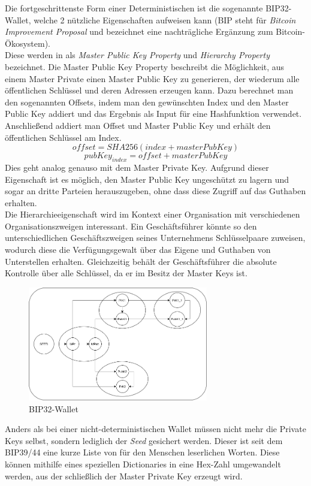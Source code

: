 Die fortgeschrittenste Form einer Deterministischen ist die sogenannte BIP32-Wallet, welche 2 nützliche Eigenschaften aufweisen kann (BIP steht für \emph{Bitcoin Improvement Proposal} und bezeichnet eine nachträgliche Ergänzung zum Bitcoin-Ökosystem).\\
Diese werden in \cite{buterin_2013} als \emph{Master Public Key Property} und \emph{Hierarchy Property} bezeichnet.
Die Master Public Key Property beschreibt die Möglichkeit, aus einem Master Private einen Master Public Key zu generieren, der wiederum alle öffentlichen Schlüssel und deren Adressen erzeugen kann. Dazu berechnet man den sogenannten Offsets, indem man den gewünschten Index und den Master Public Key addiert und das Ergebnis als Input für eine Hashfunktion verwendet. Anschließend addiert man Offset und Master Public Key und erhält den öffentlichen Schlüssel am Index.
$$offset = SHA256(index + masterPubKey)$$
$$pubKey_{index} = offset + masterPubKey$$ Dies geht analog genauso mit dem Master Private Key. 
Aufgrund dieser Eigenschaft ist es möglich, den Master Public Key ungeschützt zu lagern und sogar an dritte Parteien herauszugeben, ohne dass diese Zugriff auf das Guthaben erhalten.\\
Die Hierarchieeigenschaft wird im Kontext einer Organisation mit verschiedenen Organisationszweigen interessant. Ein Geschäftsführer könnte so den unterschiedlichen Geschäftszweigen seines Unternehmens Schlüsselpaare zuweisen, wodurch diese die Verfügungsgewalt über das Eigene und Guthaben von Unterstellen erhalten. Gleichzeitig behält der Geschäftsführer die absolute Kontrolle über alle Schlüssel, da er im Besitz der Master Keys ist. 
\begin{figure}[htpb]
	\centering
	\includegraphics[width=0.7\textwidth]{images/bip32_wallet.png}
	\caption{BIP32-Wallet}
	\label{6braun:fig:non-deterministic_wallet}
\end{figure}
Anders als bei einer nicht-deterministischen Wallet müssen nicht mehr die Private Keys selbst, sondern lediglich der \emph{Seed} gesichert werden. Dieser ist seit dem BIP39/44 eine kurze Liste von für den Menschen leserlichen Worten. Diese können mithilfe eines speziellen Dictionaries in eine Hex-Zahl umgewandelt werden, aus der schließlich der Master Private Key erzeugt wird.

